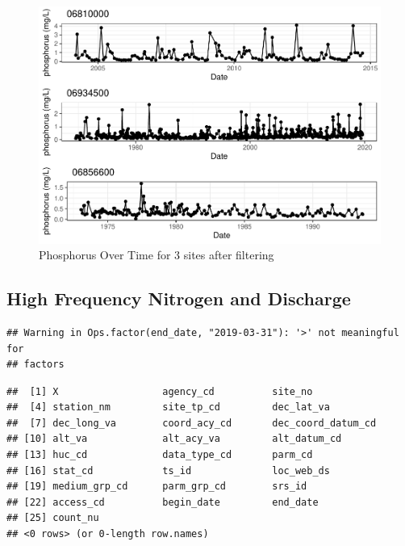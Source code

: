\documentclass[12pt,]{article}
\newenvironment{Shaded}{\begin{snugshade}}{\end{snugshade}}
\newcommand{\CommentTok}[1]{\textcolor[rgb]{0.56,0.35,0.01}{\textit{#1}}}
\newcommand{\KeywordTok}[1]{\textcolor[rgb]{0.13,0.29,0.53}{\textbf{#1}}}
\newcommand{\NormalTok}[1]{#1}
\newcommand{\OperatorTok}[1]{\textcolor[rgb]{0.81,0.36,0.00}{\textbf{#1}}}
\newcommand{\StringTok}[1]{\textcolor[rgb]{0.31,0.60,0.02}{#1}}
\begin{document}
\begin{figure}
\centering
\includegraphics{Project_Template_files/figure-latex/P.t3-1.pdf}
\caption{\label{fig:P.t3}Phosphorus Over Time for 3 sites after
filtering}
\end{figure}

\hypertarget{high-frequency-nitrogen-and-discharge}{%
\subsection{High Frequency Nitrogen and
Discharge}\label{high-frequency-nitrogen-and-discharge}}

\begin{Shaded}
\end{Shaded}

\begin{verbatim}
## Warning in Ops.factor(end_date, "2019-03-31"): '>' not meaningful for
## factors
\end{verbatim}

\begin{verbatim}
##  [1] X                  agency_cd          site_no           
##  [4] station_nm         site_tp_cd         dec_lat_va        
##  [7] dec_long_va        coord_acy_cd       dec_coord_datum_cd
## [10] alt_va             alt_acy_va         alt_datum_cd      
## [13] huc_cd             data_type_cd       parm_cd           
## [16] stat_cd            ts_id              loc_web_ds        
## [19] medium_grp_cd      parm_grp_cd        srs_id            
## [22] access_cd          begin_date         end_date          
## [25] count_nu          
## <0 rows> (or 0-length row.names)
\end{verbatim}
\end{document}
